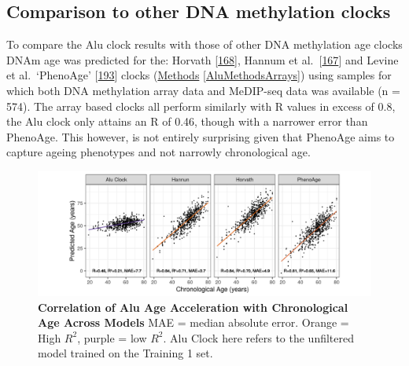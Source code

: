 \documentclass[
]{book}
\begin{document}
\hypertarget{comparison-to-other-dna-methylation-clocks}{%
\subsection{Comparison to other DNA methylation clocks}\label{comparison-to-other-dna-methylation-clocks}}

To compare the Alu clock results with those of other DNA methylation age clocks DNAm age was predicted for the: Horvath {[}\protect\hyperlink{ref-Horvath2013}{168}{]}, Hannum et al.~{[}\protect\hyperlink{ref-Hannum2013}{167}{]} and Levine et al.~`PhenoAge' {[}\protect\hyperlink{ref-Levine2018}{193}{]} clocks (\protect\hyperlink{AluMethodsArrays}{Methods} \ref{AluMethodsArrays}) using samples for which both DNA methylation array data and MeDIP-seq data was available (n = 574).
The array based clocks all perform similarly with R values in excess of 0.8, the Alu clock only attains an R of 0.46, though with a narrower error than PhenoAge.
This however, is not entirely surprising given that PhenoAge aims to capture ageing phenotypes and not narrowly chronological age.

\begin{figure}

{\centering \includegraphics[width=0.9\linewidth]{./figs/age_vs_pred_age} 

}

\caption{\textbf{Correlation of Alu Age Acceleration with Chronological Age Across Models} MAE = median absolute error. Orange = High \(R^2\), purple = low \(R^2\). Alu Clock here refers to the unfiltered model trained on the Training 1 set.}\label{fig:ageVsPredage}
\end{figure}
\end{document}
